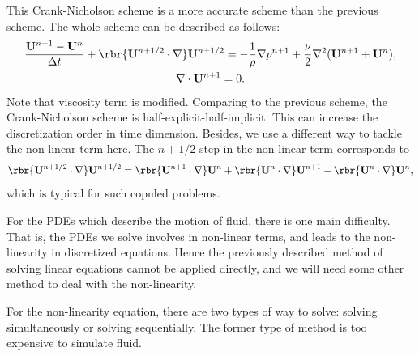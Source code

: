 \documentclass[english, nochinese]{pkupaper}
\begin{document}
This Crank-Nicholson scheme is a more accurate scheme than the previous scheme. The whole scheme can be described as follows:
\begin{equation}
\begin{gathered}
\frac{\mathbf{U}^{n+1} - \mathbf{U}^n}{\Delta t} + \rbr{\mathbf{U}^{n+1/2}\cdot\nabla} \mathbf{U}^{n+1/2} = - \frac{1}{\rho} \nabla p^{n+1} +  \frac{\nu}{2}\nabla^2(\mathbf{U}^{n+1} + \mathbf{U}^n), \\
\nabla\cdot \mathbf{U}^{n+1} = 0.
\end{gathered}
\end{equation}
Note that viscosity term is modified. Comparing to the previous scheme, the Crank-Nicholson scheme is half-explicit-half-implicit. This can increase the discretization order in time dimension. Besides, we use a different way to tackle the non-linear term here. The $n+1/2$ step in the non-linear term corresponds to
\begin{equation}
\rbr{\mathbf{U}^{n+1/2}\cdot\nabla}\mathbf{U}^{n+1/2} = \rbr{\mathbf{U}^{n+1}\cdot\nabla}\mathbf{U}^n +\rbr{\mathbf{U}^n\cdot\nabla}\mathbf{U}^{n+1} - \rbr{\mathbf{U}^n\cdot\nabla}\mathbf{U}^n,
\end{equation}
which is typical for such copuled problems.



For the PDEs which describe the motion of fluid, there is one main difficulty. That is, the PDEs we solve involves in non-linear terms, and leads to the non-linearity in discretized equations. Hence the previously described method of solving linear equations cannot be applied directly, and we will need some other method to deal with the non-linearity.


For the non-linearity equation, there are two types of way to solve: solving simultaneously or solving sequentially. The former type of method is too expensive to simulate fluid. 
\end{document}
